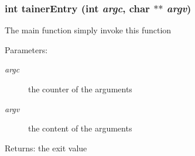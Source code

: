 \subsubsection[{tainerEntry}]{\setlength{\rightskip}{0pt plus 5cm}int tainerEntry (int {\em argc}, \/  char $\ast$$\ast$ {\em argv})}\label{TrainerCMD_8h_16127519ffec951fcf4cf053c2a573a5}


The main function simply invoke this function

\begin{Desc}
\item[Parameters:]
\begin{description}
\item[{\em argc}]the counter of the arguments \item[{\em argv}]the content of the arguments \end{description}
\end{Desc}
\begin{Desc}
\item[Returns:]the exit value \end{Desc}
